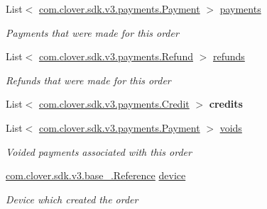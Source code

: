 \begin{DoxyCompactItemize}
\item 
List$<$ \hyperlink{classcom_1_1clover_1_1sdk_1_1v3_1_1payments_1_1_payment}{com.\+clover.\+sdk.\+v3.\+payments.\+Payment} $>$ \hyperlink{classcom_1_1clover_1_1sdk_1_1v3_1_1order_1_1_order_a0ea40bf866682b62f640bfb510c72223}{payments}
\begin{DoxyCompactList}\small\item\em Payments that were made for this order \end{DoxyCompactList}\item 
List$<$ \hyperlink{classcom_1_1clover_1_1sdk_1_1v3_1_1payments_1_1_refund}{com.\+clover.\+sdk.\+v3.\+payments.\+Refund} $>$ \hyperlink{classcom_1_1clover_1_1sdk_1_1v3_1_1order_1_1_order_a6741711b01ec81bc71bbb2e46f943268}{refunds}
\begin{DoxyCompactList}\small\item\em Refunds that were made for this order \end{DoxyCompactList}\item 
\mbox{\label{classcom_1_1clover_1_1sdk_1_1v3_1_1order_1_1_order_a47c888717541aeee0e45bea1ef2b2bb6}} 
List$<$ \hyperlink{classcom_1_1clover_1_1sdk_1_1v3_1_1payments_1_1_credit}{com.\+clover.\+sdk.\+v3.\+payments.\+Credit} $>$ {\bfseries credits}
\item 
List$<$ \hyperlink{classcom_1_1clover_1_1sdk_1_1v3_1_1payments_1_1_payment}{com.\+clover.\+sdk.\+v3.\+payments.\+Payment} $>$ \hyperlink{classcom_1_1clover_1_1sdk_1_1v3_1_1order_1_1_order_afa873072e171007d2a63a9c84be27c25}{voids}
\begin{DoxyCompactList}\small\item\em Voided payments associated with this order \end{DoxyCompactList}\item 
\hyperlink{classcom_1_1clover_1_1sdk_1_1v3_1_1base___1_1_reference}{com.\+clover.\+sdk.\+v3.\+base\+\_\+.\+Reference} \hyperlink{classcom_1_1clover_1_1sdk_1_1v3_1_1order_1_1_order_a1501b94de8b5efc7c434677b6d89b1ff}{device}
\begin{DoxyCompactList}\small\item\em Device which created the order \end{DoxyCompactList}\end{DoxyCompactItemize}


